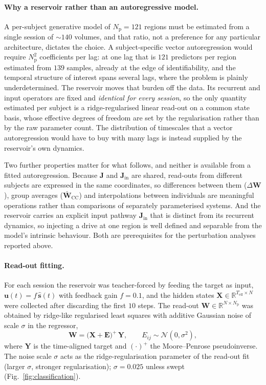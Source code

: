 \documentclass[11pt]{article}
\begin{document}
\paragraph{Why a reservoir rather than an autoregressive model.}
A per-subject generative model of $N_{\mathrm{p}}=121$ regions must be estimated
from a single session of $\sim$$140$ volumes, and that ratio, not a preference
for any particular architecture, dictates the choice. A subject-specific vector
autoregression would require $N_{\mathrm{p}}^{2}$ coefficients per lag: at one
lag that is $121$ predictors per region estimated from $139$ samples, already at
the edge of identifiability, and the temporal structure of interest spans
several lags, where the problem is plainly underdetermined. The reservoir moves
that burden off the data. Its recurrent and input operators are fixed and
\emph{identical for every session}, so the only quantity estimated per subject is
a ridge-regularised linear read-out on a common state basis, whose effective
degrees of freedom are set by the regularisation rather than by the raw parameter
count. The distribution of timescales that a vector autoregression would have to
buy with many lags is instead supplied by the reservoir's own dynamics.

Two further properties matter for what follows, and neither is available from a
fitted autoregression. Because $\mathbf{J}$ and $\mathbf{J}_{\mathrm{in}}$ are
shared, read-outs from different subjects are expressed in the same coordinates,
so differences between them ($\Delta\mathbf{W}$), group averages
($\bar{\mathbf{W}}_{\mathrm{CC}}$) and interpolations between individuals are
meaningful operations rather than comparisons of separately parameterised
systems. And the reservoir carries an explicit input pathway
$\mathbf{J}_{\mathrm{in}}$ that is distinct from its recurrent dynamics, so
injecting a drive at one region is well defined and separable from the model's
intrinsic behaviour. Both are prerequisites for the perturbation analyses
reported above.

\paragraph{Read-out fitting.}
For each session the reservoir was teacher-forced by feeding the target as
input, $\mathbf{u}(t)=f\,\hat{\mathbf{s}}(t)$ with feedback gain $f=0.1$, and
the hidden states $\mathbf{X}\in\mathbb{R}^{T_{\mathrm{eff}}\times N}$ were
collected after discarding the first $10$ steps. The read-out
$\mathbf{W}\in\mathbb{R}^{N\times N_{\mathrm{p}}}$ was obtained by
ridge-like regularised least squares with additive Gaussian noise of scale
$\sigma$ in the regressor,
\begin{equation}
\mathbf{W} = \bigl(\mathbf{X}+\mathbf{E}\bigr)^{+}\,\mathbf{Y},
\qquad E_{ij}\sim\mathcal{N}(0,\sigma^{2}),
\end{equation}
where $\mathbf{Y}$ is the time-aligned target and $(\cdot)^{+}$ the
Moore--Penrose pseudoinverse. The noise scale $\sigma$ acts as the
ridge-regularisation parameter of the read-out fit (larger $\sigma$, stronger
regularisation); $\sigma=0.025$ unless swept
(Fig.~\ref{fig:classification}).
\end{document}
